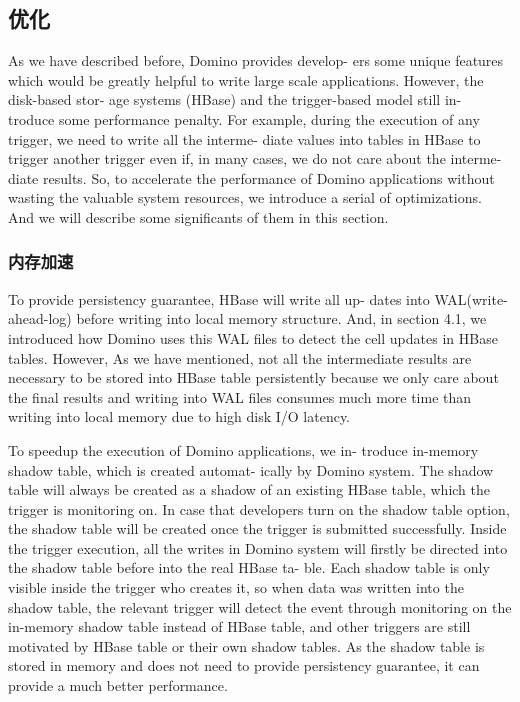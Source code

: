 \subsection{优化}
As we have described before, Domino provides develop- ers some unique features which would be greatly helpful to write large scale applications. However, the disk-based stor- age systems (HBase) and the trigger-based model still in- troduce some performance penalty. For example, during the execution of any trigger, we need to write all the interme- diate values into tables in HBase to trigger another trigger even if, in many cases, we do not care about the interme- diate results. So, to accelerate the performance of Domino applications without wasting the valuable system resources, we introduce a serial of optimizations. And we will describe some significants of them in this section.
\subsubsection{内存加速}
To provide persistency guarantee, HBase will write all up- dates into WAL(write-ahead-log) before writing into local memory structure. And, in section 4.1, we introduced how Domino uses this WAL files to detect the cell updates in HBase tables. However, As we have mentioned, not all the intermediate results are necessary to be stored into HBase table persistently because we only care about the final results and writing into WAL files consumes much more time than writing into local memory due to high disk I/O latency.

To speedup the execution of Domino applications, we in- troduce in-memory shadow table, which is created automat- ically by Domino system. The shadow table will always be created as a shadow of an existing HBase table, which the trigger is monitoring on. In case that developers turn on the shadow table option, the shadow table will be created once the trigger is submitted successfully. Inside the trigger execution, all the writes in Domino system will firstly be directed into the shadow table before into the real HBase ta- ble. Each shadow table is only visible inside the trigger who creates it, so when data was written into the shadow table, the relevant trigger will detect the event through monitoring on the in-memory shadow table instead of HBase table, and other triggers are still motivated by HBase table or their own shadow tables. As the shadow table is stored in memory and does not need to provide persistency guarantee, it can provide a much better performance.

